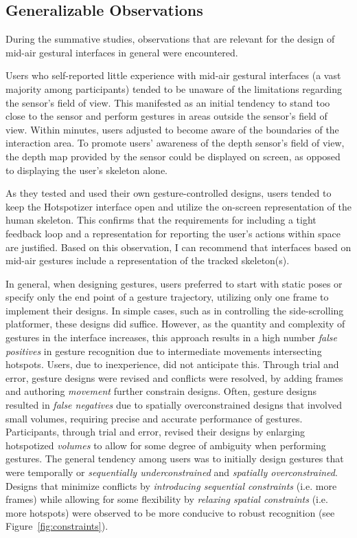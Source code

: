 \subsection{Generalizable Observations}

During the summative studies, observations that are relevant for the design of mid-air gestural interfaces in general were encountered.

Users who self-reported little experience with mid-air gestural interfaces (a vast majority among participants) tended to be unaware of the limitations regarding the sensor’s field of view. This manifested as an initial tendency to stand too close to the sensor and perform gestures in areas outside the sensor’s field of view. Within minutes, users adjusted to become aware of the boundaries of the interaction area. To promote users' awareness of the depth sensor's field of view, the depth map provided by the sensor could be displayed on screen, as opposed to displaying the user's skeleton alone.

As they tested and used their own gesture-controlled designs, users tended to keep the Hotspotizer interface open and utilize the on-screen representation of the human skeleton. This confirms that the requirements for including a tight feedback loop and a representation for reporting the user’s actions within space are justified. Based on this observation, I can recommend that interfaces based on mid-air gestures include a representation of the tracked skeleton(s).

In general, when designing gestures, users preferred to start with static poses or specify only the end point of a gesture trajectory, utilizing only one frame to implement their designs. In simple cases, such as in controlling the side-scrolling platformer, these designs did suffice. However, as the quantity and complexity of gestures in the interface increases, this approach results in a high number \emph{false positives} in gesture recognition due to intermediate movements intersecting hotspots. Users, due to inexperience, did not anticipate this. Through trial and error, gesture designs were revised and conflicts were resolved, by adding frames and authoring \emph{movement} further constrain designs. Often, gesture designs resulted in \emph{false negatives} due to spatially overconstrained designs that involved small volumes, requiring precise and accurate performance of gestures. Participants, through trial and error, revised their designs by enlarging hotspotized \emph{volumes} to allow for some degree of ambiguity when performing gestures. The general tendency among users was to initially design gestures that were temporally or \emph{sequentially underconstrained} and \emph{spatially overconstrained}. Designs that minimize conflicts by \emph{introducing sequential constraints} (i.e. more frames) while allowing for some flexibility by \emph{relaxing spatial constraints} (i.e. more hotspots) were observed to be more conducive to robust recognition (see Figure~\ref{fig:constraints}).

